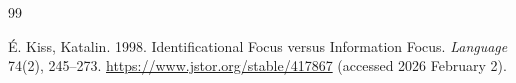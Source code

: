 \documentclass[a4paper, ruler]{CUP-JNL-LIN}%
\begin{document}
\begin{Backmatter}
\begin{thebibliography}{99}

{É. Kiss, Katalin}. 1998. Identificational Focus versus Information Focus. \textit{Language} 74(2), 245--273. \url{https://www.jstor.org/stable/417867} (accessed 2026 February 2).



\end{thebibliography}
\end{Backmatter}
\end{document}
